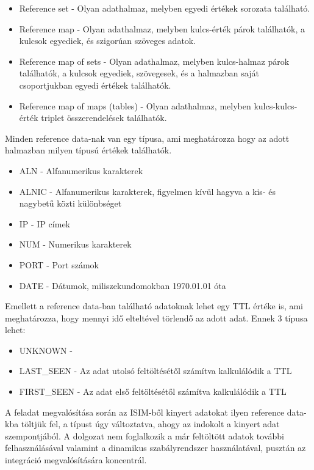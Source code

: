 \begin{itemize}
	\item Reference set - Olyan adathalmaz, melyben egyedi értékek sorozata található.
	\item Reference map - Olyan adathalmaz, melyben kulcs-érték párok találhatók, a kulcsok egyediek, és szigorúan szöveges adatok.
	\item Reference map of sets - Olyan adathalmaz, melyben kulcs-halmaz párok találhatók, a kulcsok egyediek, szövegesek, és a halmazban saját csoportjukban egyedi értékek találhatók.
	\item Reference map of maps (tables) - Olyan adathalmaz, melyben kulcs-kulcs-érték triplet összerendelések találhatók.
\end{itemize}

Minden reference data-nak van egy típusa, ami meghatározza hogy az adott halmazban milyen típusú értékek találhatók.

\begin{itemize}
	\item ALN - Alfanumerikus karakterek
	\item ALNIC - Alfanumerikus karakterek, figyelmen kívül hagyva a kis- és nagybetű közti különbséget 
	\item IP - IP címek
	\item NUM - Numerikus karakterek
	\item PORT - Port számok
	\item DATE - Dátumok, miliszekundomokban 1970.01.01 óta
\end{itemize}

Emellett a reference data-ban található adatoknak lehet egy TTL értéke is, ami meghatározza, hogy mennyi idő elteltével törlendő az adott adat. Ennek 3 típusa lehet: 
\begin{itemize}
	\item UNKNOWN - \todo
	\item LAST\_SEEN - Az adat utolsó feltöltésétől számítva kalkulálódik a TTL
	\item FIRST\_SEEN - Az adat első feltöltésétől számítva kalkulálódik a TTL
\end{itemize}

A feladat megvalósítása során az ISIM-ből kinyert adatokat ilyen reference data-kba töltjük fel, a típust úgy változtatva, ahogy az indokolt a kinyert adat szempontjából. A dolgozat nem foglalkozik a már feltöltött adatok további felhasználásával valamint a dinamikus szabályrendszer használatával, pusztán az integráció megvalósítására koncentrál.

